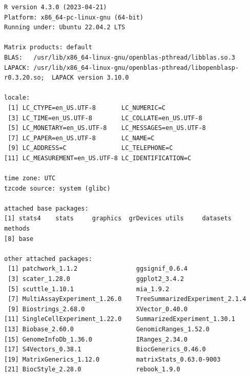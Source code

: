 \documentclass[
]{book}
\begin{document}
\begin{verbatim}
R version 4.3.0 (2023-04-21)
Platform: x86_64-pc-linux-gnu (64-bit)
Running under: Ubuntu 22.04.2 LTS

Matrix products: default
BLAS:   /usr/lib/x86_64-linux-gnu/openblas-pthread/libblas.so.3 
LAPACK: /usr/lib/x86_64-linux-gnu/openblas-pthread/libopenblasp-r0.3.20.so;  LAPACK version 3.10.0

locale:
 [1] LC_CTYPE=en_US.UTF-8       LC_NUMERIC=C              
 [3] LC_TIME=en_US.UTF-8        LC_COLLATE=en_US.UTF-8    
 [5] LC_MONETARY=en_US.UTF-8    LC_MESSAGES=en_US.UTF-8   
 [7] LC_PAPER=en_US.UTF-8       LC_NAME=C                 
 [9] LC_ADDRESS=C               LC_TELEPHONE=C            
[11] LC_MEASUREMENT=en_US.UTF-8 LC_IDENTIFICATION=C       

time zone: UTC
tzcode source: system (glibc)

attached base packages:
[1] stats4    stats     graphics  grDevices utils     datasets  methods  
[8] base     

other attached packages:
 [1] patchwork_1.1.2                ggsignif_0.6.4                
 [3] scater_1.28.0                  ggplot2_3.4.2                 
 [5] scuttle_1.10.1                 mia_1.9.2                     
 [7] MultiAssayExperiment_1.26.0    TreeSummarizedExperiment_2.1.4
 [9] Biostrings_2.68.0              XVector_0.40.0                
[11] SingleCellExperiment_1.22.0    SummarizedExperiment_1.30.1   
[13] Biobase_2.60.0                 GenomicRanges_1.52.0          
[15] GenomeInfoDb_1.36.0            IRanges_2.34.0                
[17] S4Vectors_0.38.1               BiocGenerics_0.46.0           
[19] MatrixGenerics_1.12.0          matrixStats_0.63.0-9003       
[21] BiocStyle_2.28.0               rebook_1.9.0                  


\end{verbatim}
\end{document}
